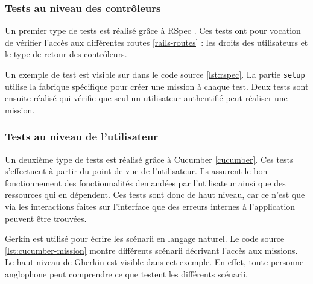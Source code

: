 \subsubsection{Tests au niveau des contrôleurs}
Un premier type de tests est réalisé grâce à RSpec \cite{rspec}. Ces tests ont pour vocation de vérifier l'accès aux différentes routes \ref{rails-routes} : les droits des utilisateurs et le type de retour des contrôleurs.

Un exemple de test est visible sur dans le code source \ref{lst:rspec}. La partie \texttt{setup} utilise la fabrique spécifique pour créer une mission à chaque test. Deux tests sont ensuite réalisé qui vérifie que seul un utilisateur authentifié peut réaliser une mission.

\begin{figure}

\end{figure}

\subsubsection{Tests au niveau de l'utilisateur}
Un deuxième type de tests est réalisé grâce à Cucumber \ref{cucumber}. Ces tests s'effectuent à partir du point de vue de l'utilisateur. Ils assurent le bon fonctionnement des fonctionnalités demandées par l'utilisateur ainsi que des ressources qui en dépendent. Ces tests sont donc de haut niveau, car ce n'est que via les interactions faites sur l'interface que des erreurs internes à l'application peuvent être trouvées.

\begin{figure}

\end{figure}

\begin{figure}

\end{figure}

Gerkin est utilisé pour écrire les scénarii en langage naturel. 
Le code source \ref{lst:cucumber-mission} montre différents scénarii décrivant l'accès aux missions. Le haut niveau de Gherkin est visible dans cet exemple. En effet, toute personne anglophone peut comprendre ce que testent les différents scénarii. 

